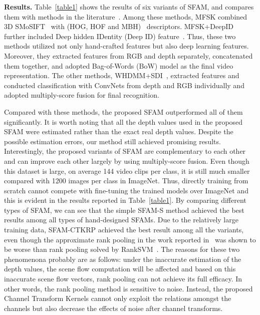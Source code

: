 \documentclass[10pt,twocolumn,letterpaper]{article}
\begin{document}
\textbf{Results.} Table~\ref{table1} shows the results of six variants of 
SFAM, 
and compares them with methods in the 
literature~\cite{pami16Jun,wanchalearn,bilen2016dynamic,pichaoTHMS}. Among these 
methods, MFSK combined 3D SMoSIFT~\cite{wan20143d} with (HOG, HOF and 
MBH)~\cite{wang2013action} descriptors.  MFSK+DeepID further included Deep 
hidden IDentity (Deep ID) feature~\cite{sun2014deep}. Thus, these two methods 
utilized not only hand-crafted features but also deep learning features. 
Moreover, they extracted features from RGB and depth separately, 
concatenated them together, and adopted Bag-of-Words (BoW) model as the final 
video representation. The other methods, 
WHDMM+SDI~\cite{pichaoTHMS,bilen2016dynamic}, extracted features and conducted 
classification with ConvNets from depth and RGB individually and adopted 
multiply-score fusion for final recognition.

Compared with these methods, the proposed SFAM outperformed all of them 
significantly. It is worth noting that all the depth values used in the proposed SFAM were estimated 
rather than the exact real depth values. Despite the possible estimation 
errors, our method still achieved promising results.
Interestingly, the proposed variants of SFAM are complementary to each other and 
can improve each other largely by using multiply-score fusion.  Even though 
this dataset is large, on average  144 video clips per class, it is still much 
smaller compared with 1200 images per class in ImageNet. Thus, directly 
training from scratch cannot compete with fine-tuning the trained 
models over ImageNet and this is evident in the results reported in 
Table~\ref{table1}.
By comparing different types of SFAM, we can see that the simple SFAM-S method 
achieved the best results among all types of hand-designed SFAMs. Due to the 
relatively large training data, SFAM-CTKRP achieved the best result among all 
the variants, even though the approximate rank pooling in the 
work reported in~\cite{bilen2016dynamic} was shown to be worse than rank 
pooling solved by RankSVM~\cite{smola2004tutorial}. The reasons for these two 
phenomenona probably are as follows: under the inaccurate estimation of the 
depth values, the scene flow computation will be affected and based on this 
inaccurate scene flow vectors, rank pooling can not achieve its full efficacy. 
In other words, the rank pooling method is sensitive to noise. Instead, the 
proposed Channel Transform Kernels cannot only exploit the relations amongst 
the channels but also decrease the effects of noise after channel transforms. 
\end{document}
